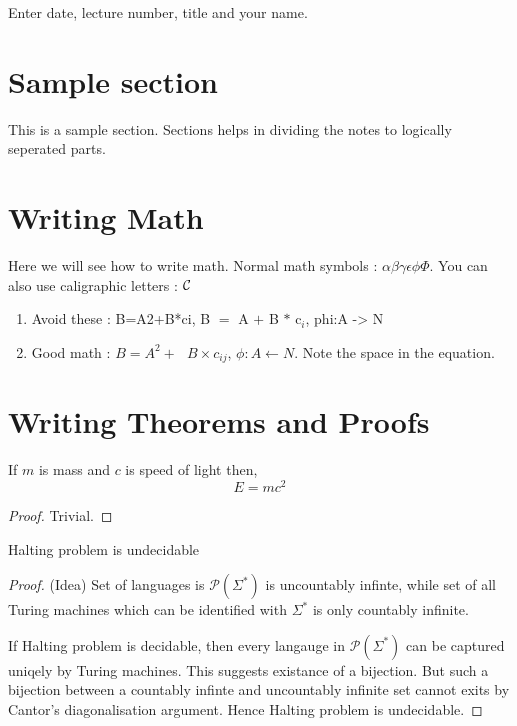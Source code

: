 
\begin{note}
	Enter date, lecture number, title and your name. 
\end{note}


\section{Sample section}
This is a sample section. Sections helps in dividing the notes to logically seperated parts.


\section{Writing Math}
Here we will see how to write math. Normal math symbols : 
$\alpha\beta\gamma\epsilon\phi\Phi $. You can also use caligraphic letters : ${\cal C}$
\begin{enumerate}
\item Avoid these : B=A2+B*ci, B $=$ A $+$ B $*$ c$_i$, phi:A -> N
\item Good math : $B=A^2 +~~~B \times c_{ij}$, $\phi: A \leftarrow N$. Note the space in the equation.
\end{enumerate}



\section{Writing Theorems and Proofs} \label{sec:rel}
\begin{theorem} \label{cl:relativity}
If $m$ is mass and $c$ is speed of light then, 
\begin{equation} \label{eq:relativity}
E = mc^2
\end{equation}

\end{theorem}
\begin{proof}
Trivial. 
\end{proof}

\begin{claim} 
Halting problem is undecidable
\end{claim}
\begin{proof}(Idea)
Set of languages is $\mathcal{P}(\Sigma^*)$ is uncountably infinte,
while set of all Turing machines which can be identified with 
$\Sigma^*$ is only countably infinite. 

If Halting problem is 
decidable, then every langauge in $\mathcal{P}(\Sigma^*)$ can be 
captured uniqely by Turing machines. This suggests existance of a 
bijection. But such a bijection between a countably infinte 
and uncountably infinite set cannot exits by Cantor's diagonalisation argument. 
Hence Halting problem is undecidable.
\end{proof}

